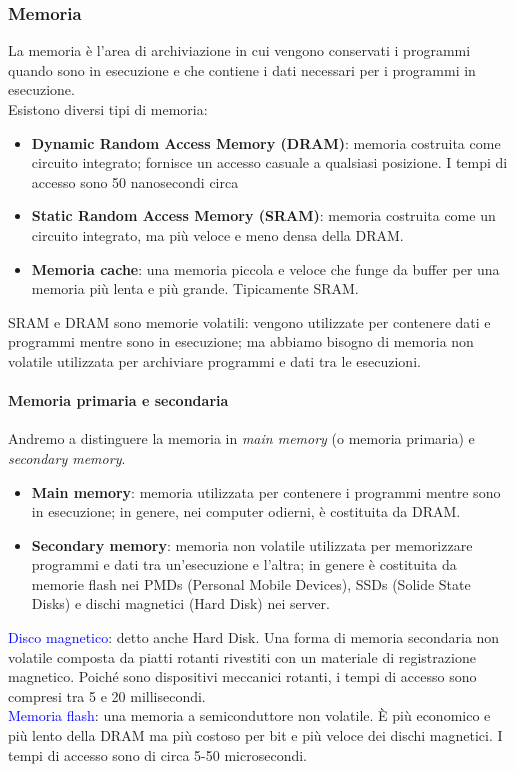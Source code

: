 \documentclass[12pt,a4paper]{article}
\begin{document}
\subsubsection{Memoria}
La memoria è l'area di archiviazione in cui vengono conservati i programmi quando sono in esecuzione e che contiene i dati necessari per i programmi in esecuzione.\\
Esistono diversi tipi di memoria:
\begin{itemize}
\item \textbf{Dynamic Random Access Memory (DRAM)}: memoria costruita come circuito integrato; fornisce un accesso casuale a qualsiasi posizione. I tempi di accesso sono 50 nanosecondi circa
\item \textbf{Static Random Access Memory (SRAM)}: memoria costruita come un circuito integrato, ma più veloce e meno densa della DRAM.
\item \textbf{Memoria cache}: una memoria piccola e veloce che funge da buffer per una memoria più lenta e più grande. Tipicamente SRAM.
\end{itemize}
SRAM e DRAM sono memorie volatili: vengono utilizzate per contenere dati e programmi mentre sono in esecuzione; ma abbiamo bisogno di memoria non volatile utilizzata per archiviare programmi e dati tra le esecuzioni.\\

\paragraph{Memoria primaria e secondaria}

Andremo a distinguere la memoria in \textsl{main memory} (o memoria primaria) e \textsl{secondary memory}.\\
\begin{itemize}
\item \textbf{Main memory}: memoria utilizzata per contenere i programmi mentre sono
in esecuzione; in genere, nei computer odierni, è costituita da DRAM.
\item \textbf{Secondary memory}: memoria non volatile utilizzata per memorizzare programmi e dati tra un'esecuzione e l'altra; in genere è costituita da memorie flash nei PMDs (Personal Mobile Devices), SSDs (Solide State Disks) e dischi magnetici (Hard Disk) nei server.
\end{itemize}
\textcolor{blue}{Disco magnetico}: detto anche Hard Disk. Una forma di memoria secondaria non volatile composta da piatti rotanti rivestiti con un materiale di registrazione magnetico. Poiché sono dispositivi meccanici rotanti, i tempi di accesso sono compresi tra 5 e 20 millisecondi.\\
\textcolor{blue}{Memoria flash}: una memoria a semiconduttore non volatile. È più economico e più lento della DRAM ma più costoso per bit e più veloce dei dischi magnetici. I tempi di  accesso sono di circa 5-50 microsecondi.
\end{document}
